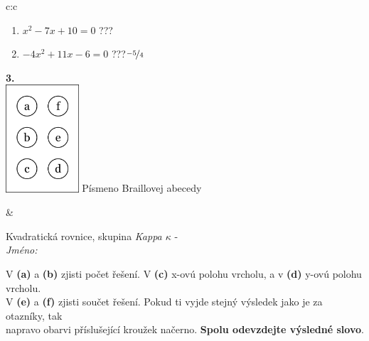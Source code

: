 \documentclass[10pt]{report}
\begin{document}
\begin{tabular}{c:c}
\begin{minipage}[c][104.5mm][t]{0.5\linewidth}
\begin{center}
\begin{minipage}{0.79\linewidth}
\begin{center}
\begin{varwidth}{\linewidth}
\begin{enumerate}
\item $x^2-7x+10=0$\quad \dotfill\; ???\;\dotfill {}
\item $-4x^2+11x-6=0$\quad \dotfill\; ???\;\dotfill \quad $\nicefrac{-5}{4}$
\end{enumerate}
\end{varwidth}
\end{center}
\end{minipage}
\begin{minipage}{0.20\linewidth}
\begin{center}
{\Huge\bfseries 3.} \\[2mm]
\includegraphics[height=40mm]{../images/braille.png}
{\small Písmeno Braillovej abecedy}
\end{center}
\end{minipage}
\end{center}
\end{minipage}
&
\begin{minipage}[c][104.5mm][t]{0.5\linewidth}
\begin{center}
\vspace{7mm}
{\huge Kvadratická rovnice, skupina \textit{Kappa $\kappa$} -}\\[5mm]
\textit{Jméno:}\phantom{xxxxxxxxxxxxxxxxxxxxxxxxxxxxxxxxxxxxxxxxxxxxxxxxxxxxxxxxxxxxxxxxx}\\[5mm]
\begin{minipage}{0.95\linewidth}
\begin{center}
V \textbf{(a)} a \textbf{(b)} zjisti počet řešení. V \textbf{(c)} x-ovú polohu vrcholu, a v \textbf{(d)} y-ovú polohu vrcholu.\\V \textbf{(e)} a \textbf{(f)} zjisti součet řešení. Pokud ti vyjde stejný výsledek jako je za otazníky, tak\\napravo obarvi příslušející kroužek načerno. \textbf{Spolu odevzdejte výsledné slovo}.
\end{center}
\end{minipage}
\\[1mm]
\begin{minipage}{0.79\linewidth}
\begin{center}

\end{center}
\end{minipage}
\end{center}
\end{minipage}
\end{tabular}
\end{document}
